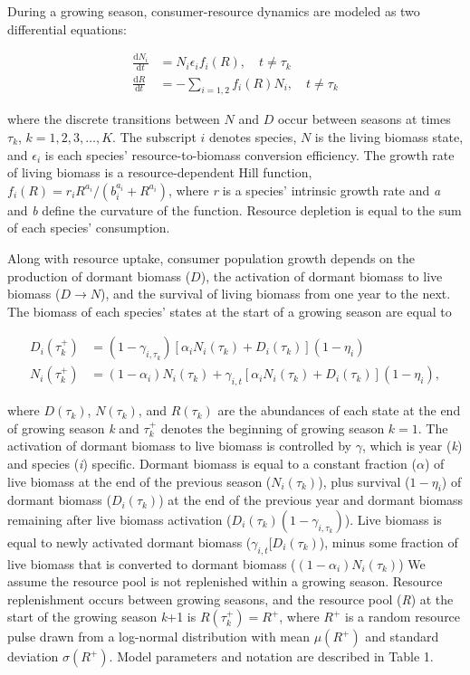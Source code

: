 \documentclass[12pt,]{article}
\begin{document}
During a growing season, consumer-resource dynamics are modeled as two
differential equations:

\begin{align}
\frac{\text{d}N_{i}}{\text{d}t} &= N_{i}\epsilon_if_{i}(R), \quad t \ne \tau_k\\
\frac{\text{d}R}{\text{d}t} &= - \sum\limits_{i=1,2}f_{i}(R)N_{i}, \quad t \ne \tau_k
\end{align}

\noindent where the discrete transitions between \(N\) and \(D\) occur
between seasons at times \(\tau_k\), \(k = 1,2,3, \dots, K\). The
subscript \(i\) denotes species, \(N\) is the living biomass state, and
\(\epsilon_i\) is each species' resource-to-biomass conversion
efficiency. The growth rate of living biomass is a resource-dependent
Hill function,
\(f_{i}(R) = r_{i}R^{a_{i}} / (b_{i}^{a_{i}}+R^{a_{i}})\), where
\emph{r} is a species' intrinsic growth rate and \emph{a} and \emph{b}
define the curvature of the function. Resource depletion is equal to the
sum of each species' consumption.

Along with resource uptake, consumer population growth depends on the
production of dormant biomass (\(D\)), the activation of dormant biomass
to live biomass (\(D \rightarrow N\)), and the survival of living
biomass from one year to the next. The biomass of each species' states
at the start of a growing season are equal to

\begin{align}
  D_{i}(\tau_k^+) &= (1-\gamma_{i,\tau_k})[\alpha_i N_{i}(\tau_k) + D_{i}(\tau_k)](1-\eta_i) \\
  N_{i}(\tau_k^+) &= (1-\alpha_i)N_{i}(\tau_k) + \gamma_{i,t}[\alpha_i N_{i}(\tau_k) + D_{i}(\tau_k)] (1-\eta_i),
\end{align}

\noindent where \(D(\tau_k)\), \(N(\tau_k)\), and \(R(\tau_k)\) are the
abundances of each state at the end of growing season \emph{k} and
\(\tau_k^+\) denotes the beginning of growing season \(k=1\). The
activation of dormant biomass to live biomass is controlled by
\(\gamma\), which is year (\emph{k}) and species (\emph{i}) specific.
Dormant biomass is equal to a constant fraction (\(\alpha\)) of live
biomass at the end of the previous season (\(N_{i}(\tau_k)\)), plus
survival (\(1-\eta_i\)) of dormant biomass (\(D_{i}(\tau_k)\)) at the
end of the previous year and dormant biomass remaining after live
biomass activation (\(D_{i}(\tau_k)(1-\gamma_{i,\tau_k})\)). Live
biomass is equal to newly activated dormant biomass
(\(\gamma_{i,t}[D_{i}(\tau_k)\)), minus some fraction of live biomass
that is converted to dormant biomass (\((1-\alpha_i)N_{i}(\tau_k)\)) We
assume the resource pool is not replenished within a growing season.
Resource replenishment occurs between growing seasons, and the resource
pool (\emph{R}) at the start of the growing season \emph{k}+1 is
\(R(\tau_k^+) = R^+\), where \(R^+\) is a random resource pulse drawn
from a log-normal distribution with mean \(\mu(R^+)\) and standard
deviation \(\sigma(R^+)\). Model parameters and notation are described
in Table 1.
\end{document}
